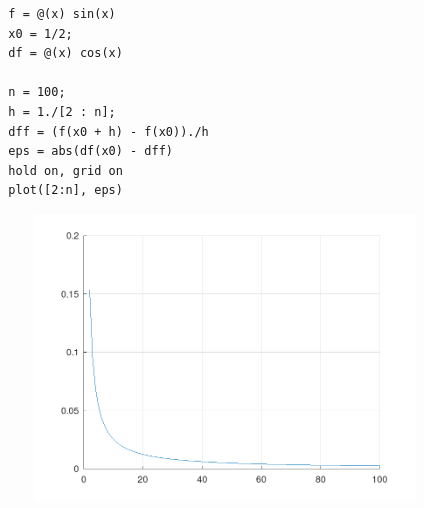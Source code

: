 \begin{lstlisting}
  f = @(x) sin(x)
  x0 = 1/2;
  df = @(x) cos(x)

  n = 100;
  h = 1./[2 : n];
  dff = (f(x0 + h) - f(x0))./h
  eps = abs(df(x0) - dff)
  hold on, grid on
  plot([2:n], eps)
\end{lstlisting}

\begin{figure}[H]
  \caption{}
  \label{fig:plot_3}
  \centering
  \includegraphics[width=0.9\textwidth]{images/image_3.png}
\end{figure}
